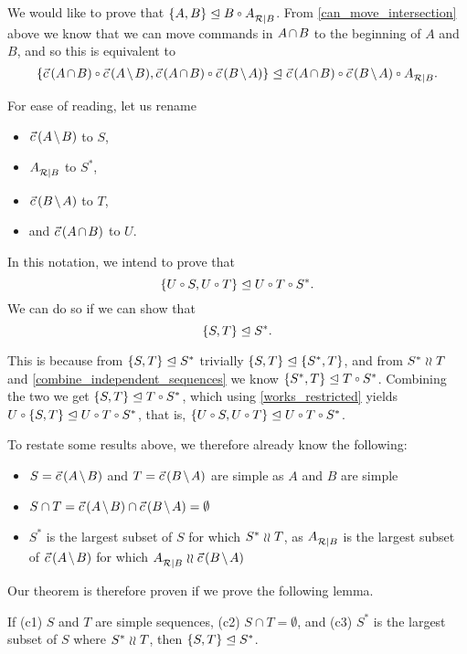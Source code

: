 \myskip
We would like to prove that $\worksmbx{A,B}{B\cc \reca}$.
From \cref{can_move_intersection} above we know that we can move commands in $\acbnp$
to the beginning of $A$ and $B$, and so this is equivalent to
\[ \worksmbx{\acb\cc\amb, \acb\cc\bma}{\acb\cc \bma\cc \reca}. \]

For ease of reading, let us rename
\begin{itemize}
\item $\amb$ to $S$,
\item ${A}^{}_{\mathcal{R}|{B}}$ to $S^*$,
\item $\bma$ to $T$,
\item and $\acb$ to $U$.
\end{itemize}
In this notation, we intend to prove that
\[ \worksmbx{U\cc S,U\cc T}{U\cc T\cc S^*}. \]
We can do so if we can show that
\[ {\{{S,T}\}}\trianglelefteq{S^*}. \]

This is because from ${\{{S,T}\}}\trianglelefteq{S^*}$ trivially ${\{{S,T}\}}\trianglelefteq{\{{S^*, T}\}}$,
and from $S^* \mathrel{\wr\wr} T$ and \cref{combine_independent_sequences} we know $\worksmbx{S^*,T}{T\cc S^*}$.
Combining the two we get $\worksmbx{S,T}{T\cc S^*}$,
which using \cref{works_restricted} yields
$\worksm{U\cc\{S,T\}}{U\cc T\cc S^*}$, that is,
$\worksmbx{U\cc S,U\cc T}{U\cc T\cc S^*}$.

\myskip
To restate some results above, we therefore already know the following:
\begin{itemize}
\item $S=\amb$ and $T=\bma$ are simple as $A$ and $B$ are simple
\item $S\cap T = \amb \cap \bma = \emptyset$
\item 
$S^*$ is the largest subset of $S$ for which $S^*\mathrel{\wr\wr} T$, as
${A}^{}_{\mathcal{R}|{B}}$ is the largest subset of $\amb$ for which $\reca\indep\bma$
\end{itemize}

Our theorem is therefore proven if we prove the following lemma.
\newcommand{\condSimple}{(c1)}
\newcommand{\condDisj}{(c2)}
\newcommand{\condApr}{(c3)}
\begin{mylem}
If
{\condSimple} $S$ and $T$ are simple sequences,
{\condDisj} $S\cap T=\emptyset$,
and {\condApr} $S^*$ is the largest subset of $S$ where $S^*\mathrel{\wr\wr} T$,
then
${\{{S,T}\}}\trianglelefteq{S^*}$.
\end{mylem}

